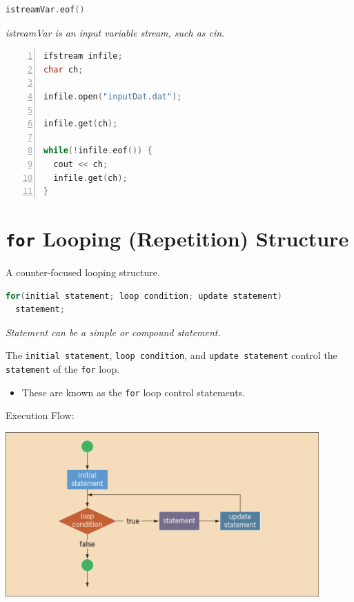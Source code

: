 \documentclass{article}
\begin{document}
\begin{lstlisting}[language=C++, caption={\texttt{eof} Function Syntax}]
istreamVar.eof()
\end{lstlisting}
\textit{istreamVar is an input variable stream, such as cin}.

\begin{lstlisting}[language=C++, caption={\texttt{eof} Example},
  numbers=left]
ifstream infile;
char ch;

infile.open("inputDat.dat");

infile.get(ch);

while(!infile.eof()) {
  cout << ch;
  infile.get(ch);
}
\end{lstlisting}

\section{\texttt{for} Looping (Repetition) Structure}

A counter-focused looping structure.

\begin{lstlisting}[language=C++, caption={\texttt{for} Loop Syntax}]
for(initial statement; loop condition; update statement)
  statement;
\end{lstlisting}
\textit{Statement can be a simple or compound statement.}

\vspace{8pt}
The \texttt{initial statement}, \texttt{loop condition}, and \texttt{update
statement} control the \texttt{statement} of the \texttt{for} loop.
\begin{itemize}
  \item These are known as the \texttt{for} loop control statements.
\end{itemize}

\vspace{8pt}
Execution Flow:
\begin{center}
    \includegraphics[width=0.9\textwidth]{for-exec-flow.png}
\end{center}
\end{document}
